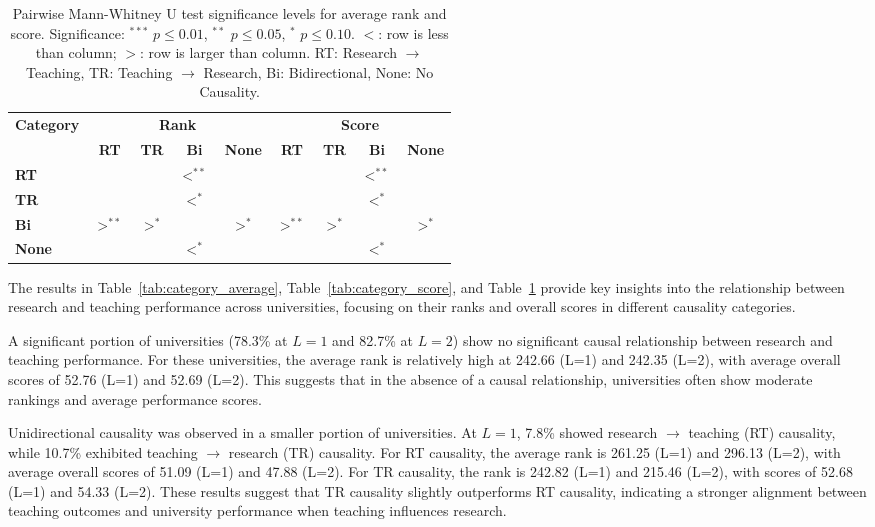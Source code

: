 \documentclass[conference]{IEEEtran}
\begin{document}
\begin{table}
	\centering
	\caption{Pairwise Mann-Whitney U test significance levels for average rank and score. Significance: $^{***}$ $p \leq 0.01$, $^{**}$ $p \leq 0.05$, $^{*}$ $p \leq 0.10$. $<$: row is less than column; $>$: row is larger than column. RT: Research $\rightarrow$ Teaching, TR: Teaching $\rightarrow$ Research, Bi: Bidirectional, None: No Causality.}
	\label{tab:significance}
	\begin{scriptsize}
		\begin{tabular}{|l|cccc|cccc|}
			\hline
			\multirow{2}{*}{\textbf{Category}} 
			& \multicolumn{4}{c|}{\textbf{Rank}} 
			& \multicolumn{4}{c|}{\textbf{Score}} \\ \cline{2-9}
			& \textbf{RT} & \textbf{TR} & \textbf{Bi} & \textbf{None} 
			& \textbf{RT} & \textbf{TR} & \textbf{Bi} & \textbf{None} \\ \hline
			\textbf{RT}   &     &      & $<^{**}$ &      &     &      & $<^{**}$ &      \\ \hline
			\textbf{TR}   &     &      & $<^{*}$  &      &     &      & $<^{*}$  &      \\ \hline
			\textbf{Bi}   & $>^{**}$ & $>^{*}$   &     & $>^{*}$   & $>^{**}$ & $>^{*}$   &     & $>^{*}$   \\ \hline
			\textbf{None} &     &      & $<^{*}$  &     &     &      & $<^{*}$  &     \\ \hline
		\end{tabular}
	\end{scriptsize}
\end{table}

The results in Table~\ref{tab:category_average}, Table~\ref{tab:category_score}, and Table~\ref{tab:significance} provide key insights into the relationship between research and teaching performance across universities, focusing on their ranks and overall scores in different causality categories.

A significant portion of universities (78.3\% at $L=1$ and 82.7\% at $L=2$) show no significant causal relationship between research and teaching performance. For these universities, the average rank is relatively high at 242.66 (L=1) and 242.35 (L=2), with average overall scores of 52.76 (L=1) and 52.69 (L=2). This suggests that in the absence of a causal relationship, universities often show moderate rankings and average performance scores.

Unidirectional causality was observed in a smaller portion of universities. At $L=1$, 7.8\% showed research $\rightarrow$ teaching (RT) causality, while 10.7\% exhibited teaching $\rightarrow$ research (TR) causality. For RT causality, the average rank is 261.25 (L=1) and 296.13 (L=2), with average overall scores of 51.09 (L=1) and 47.88 (L=2). For TR causality, the rank is 242.82 (L=1) and 215.46 (L=2), with scores of 52.68 (L=1) and 54.33 (L=2). These results suggest that TR causality slightly outperforms RT causality, indicating a stronger alignment between teaching outcomes and university performance when teaching influences research.
\end{document}
